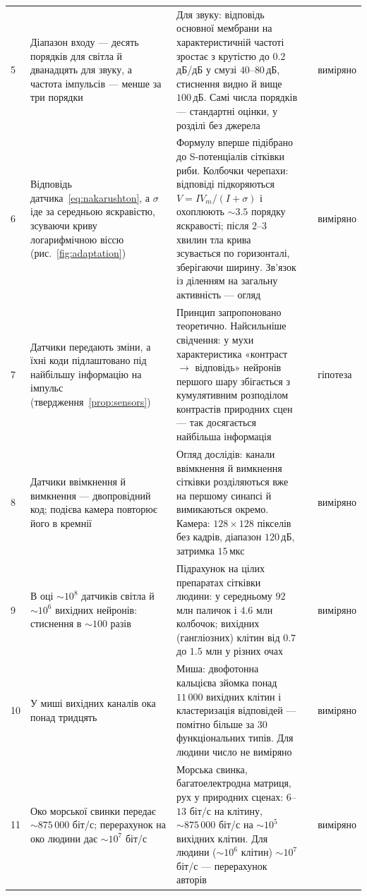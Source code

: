 {\begin{longtable}{>{\raggedright}p{0.5cm}>{\raggedright}p{4.0cm}>{\raggedright}p{5.6cm}>{\raggedright}p{2.3cm}>{\raggedright\arraybackslash}p{1.7cm}}
5 & Діапазон входу --- десять порядків для світла й дванадцять для звуку, а частота імпульсів --- менше за три порядки & Для звуку: відповідь основної мембрани на характеристичній частоті зростає з крутістю до $0.2$\,дБ/дБ у смузі $40$--$80$\,дБ, стиснення видно й вище $100$\,дБ. Самі числа порядків --- стандартні оцінки, у розділі без джерела & \cite{Ruggero1997} & виміряно \\
6 & Відповідь датчика~\eqref{eq:nakarushton}, а $\sigma$ іде за середньою яскравістю, зсуваючи криву логарифмічною віссю (рис.~\ref{fig:adaptation}) & Формулу вперше підібрано до S-потенціалів сітківки риби. Колбочки черепахи: відповіді підкоряються $V=I V_m/(I+\sigma)$ і охоплюють $\sim3.5$ порядку яскравості; після $2$--$3$ хвилин тла крива зсувається по горизонталі, зберігаючи ширину. Зв'язок із діленням на загальну активність --- огляд & \cite{NakaRushton1966,NormannPerlman1979,Carandini2012} & виміряно \\
7 & Датчики передають зміни, а їхні коди підлаштовано під найбільшу інформацію на імпульс (твердження~\ref{prop:sensors}) & Принцип запропоновано теоретично. Найсильніше свідчення: у мухи характеристика «контраст $\to$ відповідь» нейронів першого шару збігається з кумулятивним розподілом контрастів природних сцен --- так досягається найбільша інформація & \cite{Barlow1961,Laughlin1981} & гіпотеза \\
8 & Датчики ввімкнення й вимкнення --- двопровідний код; подієва камера повторює його в кремнії & Огляд дослідів: канали ввімкнення й вимкнення сітківки розділяються вже на першому синапсі й вимикаються окремо. Камера: $128\times128$ пікселів без кадрів, діапазон $120$\,дБ, затримка $15$\,мкс & \cite{Schiller1992,Lichtsteiner2008,Gallego2022} & виміряно \\
9 & В оці $\sim10^8$ датчиків світла й $\sim10^6$ вихідних нейронів: стиснення в $\sim100$ разів & Підрахунок на цілих препаратах сітківки людини: у середньому $92$ млн паличок і $4.6$ млн колбочок; вихідних (гангліозних) клітин від $0.7$ до $1.5$ млн у різних очах & \cite{Curcio1990,CurcioAllen1990} & виміряно \\
10 & У миші вихідних каналів ока понад тридцять & Миша: двофотонна кальцієва зйомка понад $11\,000$ вихідних клітин і кластеризація відповідей --- помітно більше за $30$ функціональних типів. Для людини число не виміряно & \cite{Baden2016} & виміряно \\
11 & Око морської свинки передає $\sim875\,000$ біт/с; перерахунок на око людини дає $\sim10^7$ біт/с & Морська свинка, багатоелектродна матриця, рух у природних сценах: $6$--$13$ біт/с на клітину, $\sim875\,000$ біт/с на $\sim10^5$ вихідних клітин. Для людини ($\sim10^6$ клітин) $\sim10^7$ біт/с --- перерахунок авторів & \cite{Koch2006} & виміряно \\

\end{longtable}}
